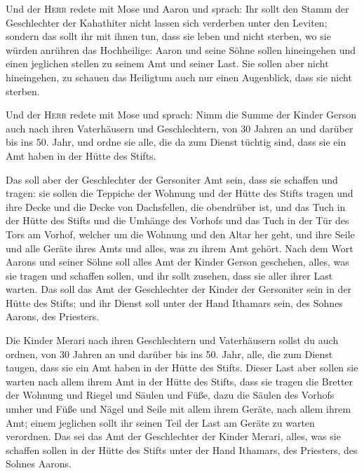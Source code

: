  Und der \textsc{Herr} redete mit Mose und Aaron und
sprach:  Ihr sollt den Stamm der Geschlechter der
Kahathiter nicht lassen sich verderben unter den Leviten;
 sondern das sollt ihr mit ihnen tun, dass sie leben und
nicht sterben, wo sie würden anrühren das Hochheilige: Aaron und seine
Söhne sollen hineingehen und einen jeglichen stellen zu seinem Amt und
seiner Last.  Sie sollen aber nicht hineingehen, zu
schauen das Heiligtum auch nur einen Augenblick, dass sie nicht sterben.

 Und der \textsc{Herr} redete mit Mose und sprach:
 Nimm die Summe der Kinder Gerson auch nach ihren
Vaterhäusern und Geschlechtern,  von 30 Jahren an und
darüber bis ins 50. Jahr, und ordne sie alle, die da zum Dienst tüchtig
sind, dass sie ein Amt haben in der Hütte des Stifts.

 Das soll aber der Geschlechter der Gersoniter Amt sein,
dass sie schaffen und tragen:  sie sollen die Teppiche
der Wohnung und der Hütte des Stifts tragen und ihre Decke und die Decke
von Dachsfellen, die obendrüber ist, und das Tuch in der Hütte des
Stifts  und die Umhänge des Vorhofs und das Tuch in der
Tür des Tors am Vorhof, welcher um die Wohnung und den Altar her geht,
und ihre Seile und alle Geräte ihres Amts und alles, was zu ihrem Amt
gehört.  Nach dem Wort Aarons und seiner Söhne soll alles
Amt der Kinder Gerson geschehen, alles, was sie tragen und schaffen
sollen, und ihr sollt zusehen, dass sie aller ihrer Last warten.
 Das soll das Amt der Geschlechter der Kinder der
Gersoniter sein in der Hütte des Stifts; und ihr Dienst soll unter der
Hand Ithamars sein, des Sohnes Aarons, des Priesters.

 Die Kinder Merari nach ihren Geschlechtern und
Vaterhäusern sollst du auch ordnen,  von 30 Jahren an und
darüber bis ins 50. Jahr, alle, die zum Dienst taugen, dass sie ein Amt
haben in der Hütte des Stifts.  Dieser Last aber sollen
sie warten nach allem ihrem Amt in der Hütte des Stifts, dass sie tragen
die Bretter der Wohnung und Riegel und Säulen und Füße, 
dazu die Säulen des Vorhofs umher und Füße und Nägel und Seile mit allem
ihrem Geräte, nach allem ihrem Amt; einem jeglichen sollt ihr seinen
Teil der Last am Geräte zu warten verordnen.  Das sei das
Amt der Geschlechter der Kinder Merari, alles, was sie schaffen sollen
in der Hütte des Stifts unter der Hand Ithamars, des Priesters, des
Sohnes Aarons.

